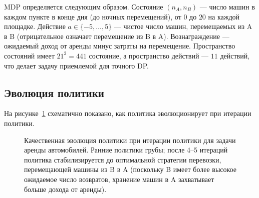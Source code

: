 MDP определяется следующим образом.  Состояние $(n_A, n_B)$ — число машин в каждом пункте в конце дня (до ночных перемещений), от $0$ до $20$ на каждой площадке.  Действие $a \in \{-5,\ldots,5\}$ — чистое число машин, перемещаемых из A в B (отрицательное означает перемещение из B в A).  Вознаграждение — ожидаемый доход от аренды минус затраты на перемещение.  Пространство состояний имеет $21^2 = 441$ состояние, а пространство действий — $11$ действий, что делает задачу приемлемой для точного DP.

\subsection*{Эволюция политики}

На рисунке~\ref{fig:car-rental} схематично показано, как политика эволюционирует при итерации политики.

\begin{figure}[ht]
\centering
{}
\caption{Качественная эволюция политики при итерации политики для задачи аренды автомобилей.  Ранние политики грубы; после 4--5 итераций политика стабилизируется до оптимальной стратегии перевозки, перемещающей машины из B в A (поскольку B имеет более высокое ожидаемое число возвратов, хранение машин в A захватывает больше дохода от аренды).}
\label{fig:car-rental}
\end{figure}

